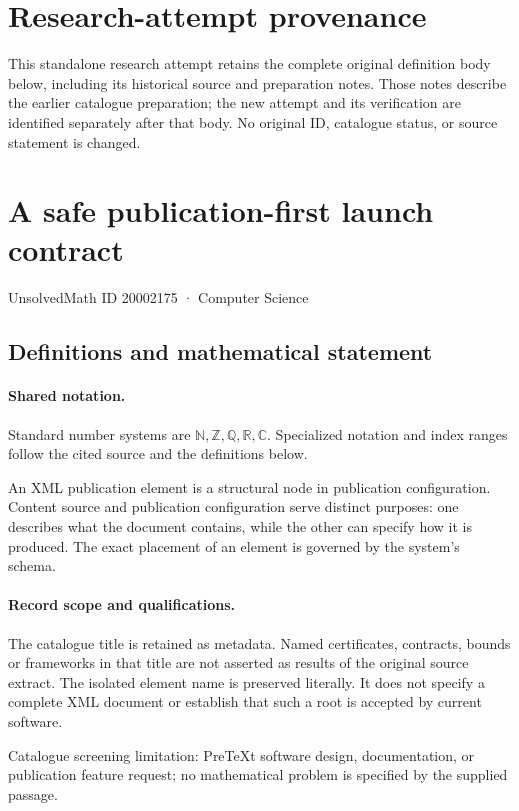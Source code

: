 \documentclass[11pt]{article}
\begin{document}
\section*{Research-attempt provenance}
This standalone research attempt retains the complete original definition body below,
including its historical source and preparation notes. Those notes describe the
earlier catalogue preparation; the new attempt and its verification are identified
separately after that body. No original ID, catalogue status, or source statement is changed.

\section{A safe publication-first launch contract}\label{20002175}
{\small UnsolvedMath ID 20002175 · Computer Science}
\subsection{Definitions and mathematical statement}

\paragraph{Shared notation.}Standard number systems are $\mathbb N,\mathbb Z,\mathbb Q,\mathbb R,\mathbb C$. Specialized notation and index ranges follow the cited source and the definitions below.


An XML publication element is a structural node in publication configuration. Content source and publication configuration serve distinct purposes: one describes what the document contains, while the other can specify how it is produced. The exact placement of an element is governed by the system's schema.
\paragraph{Record scope and qualifications.}
The catalogue title is retained as metadata. Named certificates, contracts, bounds or frameworks in that title are not asserted as results of the original source extract.
The isolated element name is preserved literally. It does not specify a complete XML document or establish that such a root is accepted by current software.

Catalogue screening limitation: PreTeXt software design, documentation, or publication feature request; no mathematical problem is specified by the supplied passage.
\end{document}
